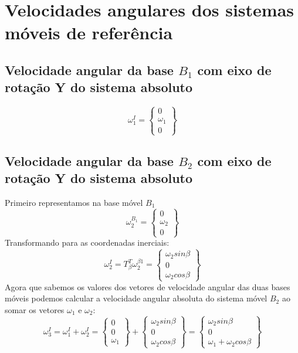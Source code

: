 \documentclass[a4paper, 12pt]{article}
\begin{document}
\section{Velocidades angulares dos sistemas móveis de referência}
	\subsection{Velocidade angular da base $B_1$ com eixo de rotação Y do sistema absoluto}
	\begin{equation}
		\omega^I_1 = 
		\begin{Bmatrix}
			0\\ \omega_1\\0\
		\end{Bmatrix}
	\end{equation}
	
	\subsection{Velocidade angular da base $B_2$ com eixo de rotação Y do sistema absoluto}
	Primeiro representamos na base móvel $B_1$
	\begin{equation}
		\omega^{B_1}_2 = 
		\begin{Bmatrix}
			0\\ \omega_2 \\0
		\end{Bmatrix}
	\end{equation}
	Transformando para as coordenadas inerciais:
	\begin{equation}
		\omega^I_2 = T^T_\beta \omega^{\beta 1}_2 = \begin{Bmatrix}
			\omega_2 sin\beta\\
			0\\
			\omega_2 cos\beta
		\end{Bmatrix}
	\end{equation}
	Agora que sabemos os valores dos vetores de velocidade angular das duas bases móveis podemos calcular a velocidade angular absoluta do sistema móvel $B_2$ ao somar os vetores $\omega_1$ e $\omega_2$:
		\begin{equation}
			\omega^I_3 = \omega_1^I + \omega_2^I = \begin{Bmatrix}
			0\\ 0\\ \omega_1
		\end{Bmatrix} + 		
		\begin{Bmatrix}
			\omega_2 sin\beta\\
			0\\
			\omega_2 cos\beta
		\end{Bmatrix} = 
		\begin{Bmatrix}
			\omega_2 sin\beta\\
			0\\
			\omega_1 + \omega_2 cos\beta
		\end{Bmatrix}
		\end{equation}
\end{document}
